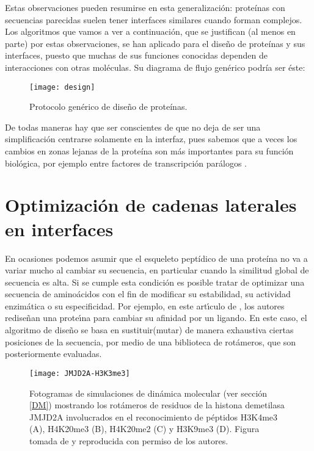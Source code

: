 Estas observaciones pueden resumirse en esta generalizaci\'{o}n: 
prote\'{i}nas con secuencias parecidas suelen tener interfaces similares cuando forman complejos. 
Los algoritmos que vamos a ver a continuaci\'{o}n, que se justifican (al menos en parte)
por estas observaciones, se han aplicado para el dise\~no de prote\'{i}nas y sus interfaces,
puesto que muchas de sus funciones conocidas dependen de interacciones con otras mol\'{e}culas.
Su diagrama de flujo gen\'{e}rico podr\'{i}a ser \'{e}ste:

\begin{figure}
\begin{center} 
\texttt{[image: design]}
\caption%
{
Protocolo gen\'{e}rico de dise\~no de prote\'{i}nas.
}
\label{fig:design}
\end{center}
\end{figure}


De todas maneras hay que ser conscientes de que no deja de ser una simplificaci\'{o}n centrarse solamente en la interfaz, 
pues sabemos que a veces los cambios en zonas lejanas de la prote\'{i}na son m\'{a}s importantes para su funci\'{o}n biol\'{o}gica, 
por ejemplo entre factores de transcripci\'{o}n par\'{a}logos \citep{Hudson2016}.

\section{Optimizaci\'{o}n de cadenas laterales en interfaces} \label{scwrl}

En ocasiones podemos asumir que el esqueleto pept\'{i}dico de una prote\'{i}na %
no va a variar mucho al cambiar su secuencia, en particular cuando la similitud global de secuencia es alta.
Si se cumple esta condici\'{o}n es posible tratar de optimizar una secuencia de amino\'{a}cidos con
el fin de modificar su estabilidad, su actividad enzim\'{a}tica o su especificidad. Por ejemplo, 
en este art\'\i{}culo de \citet{Reina2002}, %
los autores redise\~nan una prote\'\i{}na para cambiar su afinidad por un ligando. En este caso, el algoritmo de 
dise\~no se basa en sustituir(mutar) de manera exhaustiva ciertas posiciones de la secuencia, por medio de
una biblioteca de rot\'{a}meros, que son posteriormente evaluadas.


\begin{figure}
\begin{center} 
\texttt{[image: JMJD2A-H3K3me3]}
\caption%
{
Fotogramas de simulaciones de din\'{a}mica molecular (ver secci\'{o}n \ref{DM}) mostrando los rot\'{a}meros de residuos
de la histona demetilasa JMJD2A involucrados en el reconocimiento de p\'{e}ptidos H3K4me3 (A), H4K20me3 (B), H4K20me2 (C) y H3K9me3 (D).
Figura tomada de \citet{Ozboyaci2011} y reproducida con permiso de los autores.
}
\label{fig:JMJD2A}
\end{center}
\end{figure}

